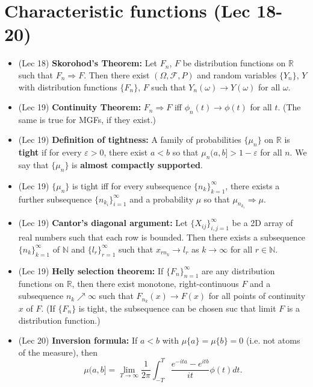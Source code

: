 \documentclass[twoside]{article}
\newcommand\bbN{\mathbb{N}}
\newcommand\bbR{\mathbb{R}}
\newcommand\calF{\mathcal{F}}
\def\eps{\varepsilon}
\newcommand\om{\omega}
\newcommand\Om{\Omega}
\newcommand\goesto{\rightarrow}
\begin{document}
\section*{Characteristic functions (Lec 18-20)}
\begin{itemize}
\item (Lec 18) \textbf{Skorohod's Theorem:} Let $F_n$, $F$ be distribution functions on $\bbR$ such that $F_n \Rightarrow F$. Then there exist $(\Om, \calF, P)$ and random variables $\{Y_n\}$, $Y$ with distribution functions $\{F_n\}$, $F$ such that $Y_n(\om) \rightarrow Y(\om)$ for all $\om$.

\item (Lec 19) \textbf{Continuity Theorem:} $F_n \Rightarrow F$ iff $\phi_n(t) \rightarrow \phi(t)$ for all $t$. (The same is true for MGFs, if they exist.)

\item (Lec 19) \textbf{Definition of tightness:} A family of probabilities $\{\mu_n\}$ on $\bbR$ is \textbf{tight} if for every $\eps > 0$, there exist $a < b$ so that $\mu_n(a, b] > 1 - \eps$ for all $n$. We say that $\{\mu_n\}$ is \textbf{almost compactly supported}.

\item (Lec 19) $\{ \mu_n \}$ is tight iff for every subsequence $\{ n_k \}_{k=1}^\infty$, there exists a further subsequence $\{ n_{k_i} \}_{i=1}^\infty$ and a probability $\mu$ so that $\mu_{n_{k_i}} \Rightarrow \mu$.

\item (Lec 19) \textbf{Cantor's diagonal argument:} Let $\{ X_{ij}\}_{i,j = 1}^\infty$ be a 2D array of real numbers such that each row is bounded. Then there exists a subsequence $\{ n_k\}_{k=1}^\infty$ of $\bbN$ and $\{l_r\}_{r = 1}^\infty$ such that $x_{rn_k} \goesto l_r$ as $k \goesto \infty$ for all $r \in \bbN$.

\item (Lec 19) \textbf{Helly selection theorem:} If $\{F_n \}_{n=1}^\infty$ are any distribution functions on $\bbR$, then there exist monotone, right-continuous $F$ and a subsequence $n_k \nearrow \infty$ such that $F_{n_k}(x) \rightarrow F(x)$ for all points of continuity $x$ of $F$. (If $\{F_n \}$ is tight, the subsequence can be chosen suc that limit $F$ is a distribution function.)

\item (Lec 20) \textbf{Inversion formula:} If $a < b$ with $\mu\{a\} = \mu\{b\} = 0$ (i.e. not atoms of the measure), then 
\begin{equation*} \mu(a, b] = \lim_{T \rightarrow \infty} \frac{1}{2\pi}\int_{-T}^T \frac{e^{-ita} - e^{itb}}{it} \phi(t) dt. \end{equation*}


\end{itemize}
\end{document}
